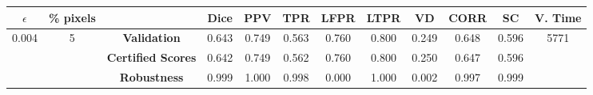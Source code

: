 \begin{longtable}{ c  c | c | c  c  c  c  c  c  c c c}
\toprule \textbf{$\epsilon$} & \textbf{\% pixels} & & \textbf{Dice} & \textbf{PPV} & \textbf{TPR} & \textbf{LFPR} & \textbf{LTPR} & \textbf{VD} & \textbf{CORR} & \textbf{SC} & \textbf{V. Time} \\
\midrule 
\multirow{3}{*}{0.004}  & \multirow{3}{*}{5} &\textbf{Validation} & 0.643 & 0.749 & 0.563 & 0.760 & 0.800 & 0.249 & 0.648 & 0.596 & \multirow{3}{*}{5771} \\
 & & \textbf{Certified Scores} & 0.642 & 0.749 & 0.562 & 0.760 & 0.800 & 0.250 & 0.647 & 0.596 & \\
& & \textbf{Robustness} & 0.999 & 1.000 & 0.998 & 0.000 & 1.000 & 0.002 & 0.997 & 0.999 & \\
\end{longtable}